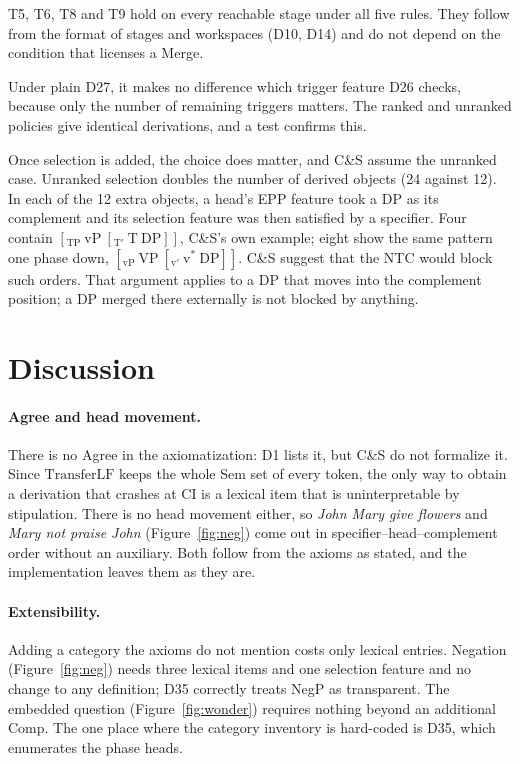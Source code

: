 \documentclass[11pt]{article}
\newcommand{\pf}[1]{\textit{#1}}
\newcommand{\Def}[1]{D#1}
\newcommand{\Thm}[1]{T#1}
\newcommand{\TLF}{\mathrm{TransferLF}}
\theoremstyle{definition}
\theoremstyle{plain}
\begin{document}
\Thm{5}, \Thm{6}, \Thm{8} and \Thm{9} hold on every reachable stage under
all five rules. They follow from the format of stages and workspaces
(\Def{10}, \Def{14}) and do not depend on the condition that licenses a
Merge.

Under plain \Def{27}, it makes no difference which trigger feature \Def{26}
checks, because only the number of remaining triggers matters. The ranked
and unranked policies give identical derivations, and a test confirms this.

Once selection is added, the choice does matter, and C\&S assume the
unranked case. Unranked selection doubles the number of derived objects (24
against 12). In each of the 12 extra objects, a head's EPP feature took a DP
as its complement and its selection feature was then satisfied by a
specifier. Four contain $[_{\mathrm{TP}}\ \mathrm{vP}\ [_{\mathrm{T'}}\
\mathrm{T}\ \mathrm{DP}]]$, C\&S's own example; eight show the same pattern
one phase down, $[_{\mathrm{vP}}\ \mathrm{VP}\ [_{\mathrm{v'}}\
\mathrm{v}^*\ \mathrm{DP}]]$. C\&S suggest that the NTC would block such
orders. That argument applies to a DP that moves into the complement
position; a DP merged there externally is not blocked by anything.

\section{Discussion}
\label{sec:discussion}

\paragraph{Agree and head movement.}
There is no Agree in the axiomatization: \Def{1} lists it, but C\&S do not
formalize it. Since $\TLF$ keeps the whole Sem set of every token, the only
way to obtain a derivation that crashes at CI is a lexical item that is
uninterpretable by stipulation. There is no head movement either, so
\pf{John Mary give flowers} and \pf{Mary not praise John}
(Figure~\ref{fig:neg}) come out in specifier--head--complement order without
an auxiliary. Both follow from the axioms as stated, and the implementation
leaves them as they are.

\paragraph{Extensibility.}
Adding a category the axioms do not mention costs only lexical entries.
Negation (Figure~\ref{fig:neg}) needs three lexical items and one selection
feature and no change to any definition; \Def{35} correctly treats NegP as
transparent. The embedded question (Figure~\ref{fig:wonder}) requires nothing
beyond an additional Comp. The one place where the category inventory is
hard-coded is \Def{35}, which enumerates the phase heads.
\end{document}
